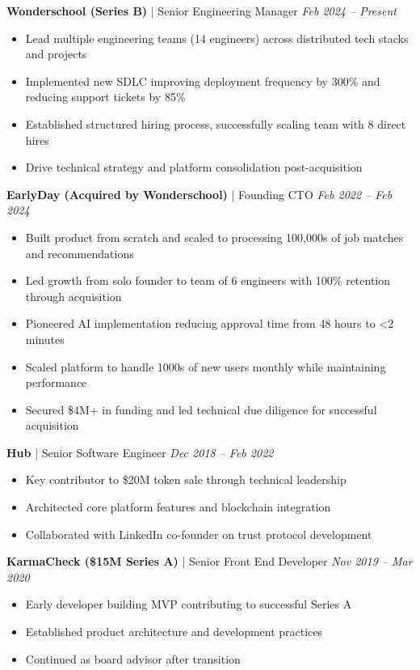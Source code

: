 \documentclass[letterpaper,10pt]{article}
\begin{document}
\textbf{Wonderschool (Series B)} | Senior Engineering Manager \hfill \textit{Feb 2024 -- Present}
\begin{itemize}[leftmargin=*, nosep]
    \item Lead multiple engineering teams (14 engineers) across distributed tech stacks and projects
    \item Implemented new SDLC improving deployment frequency by 300\% and reducing support tickets by 85\%
    \item Established structured hiring process, successfully scaling team with 8 direct hires
    \item Drive technical strategy and platform consolidation post-acquisition
\end{itemize}

\textbf{EarlyDay (Acquired by Wonderschool)} | Founding CTO \hfill \textit{Feb 2022 -- Feb 2024}
\begin{itemize}[leftmargin=*, nosep]
    \item Built product from scratch and scaled to processing 100,000s of job matches and recommendations
    \item Led growth from solo founder to team of 6 engineers with 100\% retention through acquisition
    \item Pioneered AI implementation reducing approval time from 48 hours to <2 minutes
    \item Scaled platform to handle 1000s of new users monthly while maintaining performance
    \item Secured \$4M+ in funding and led technical due diligence for successful acquisition
\end{itemize}

\textbf{Hub} | Senior Software Engineer \hfill \textit{Dec 2018 -- Feb 2022}
\begin{itemize}[leftmargin=*, nosep]
    \item Key contributor to \$20M token sale through technical leadership
    \item Architected core platform features and blockchain integration
    \item Collaborated with LinkedIn co-founder on trust protocol development
\end{itemize}

\textbf{KarmaCheck (\$15M Series A)} | Senior Front End Developer \hfill \textit{Nov 2019 -- Mar 2020}
\begin{itemize}[leftmargin=*, nosep]
    \item Early developer building MVP contributing to successful Series A
    \item Established product architecture and development practices
    \item Continued as board advisor after transition
\end{itemize}
\end{document}
